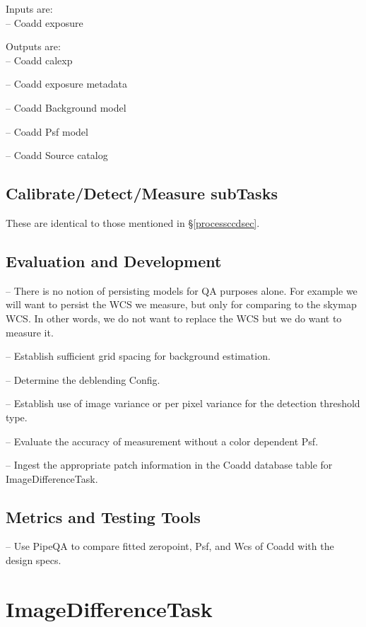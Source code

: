 \documentclass[prd, nofootinbib, floatfix, 11pt,tightenlines,times]{article}
\begin{document}
Inputs are: \\

-- Coadd exposure

Outputs are:\\

-- Coadd calexp

-- Coadd exposure metadata

-- Coadd Background model

-- Coadd Psf model

-- Coadd Source catalog

\subsection{Calibrate/Detect/Measure subTasks}
These are identical to those mentioned in \S \ref{processccdsec}.

\subsection{Evaluation and Development}

-- There is no notion of persisting models for QA purposes alone.  For example we will want to persist
the WCS we measure, but only for comparing to the skymap WCS.  In other words, we do not want to replace the 
WCS but we do want to measure it.  

-- Establish sufficient grid spacing for background estimation.

-- Determine the deblending Config.

-- Establish use of image variance or per pixel variance for the detection threshold type.

-- Evaluate the accuracy of measurement without a color dependent Psf.

-- Ingest the appropriate patch information in the Coadd database table for ImageDifferenceTask.


\subsection{Metrics and Testing Tools}

-- Use PipeQA to compare fitted zeropoint, Psf, and Wcs of Coadd with the design specs.


\section{ImageDifferenceTask \label{sec-imagedifftask}} 
\end{document}

